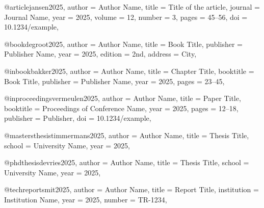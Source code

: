 %
%

@article{jansen2025,
  author  = {Author Name},
  title   = {Title of the article},
  journal = {Journal Name},
  year    = {2025},
  volume  = {12},
  number  = {3},
  pages   = {45--56},
  doi     = {10.1234/example},
}

@book{degroot2025,
  author    = {Author Name},
  title     = {Book Title},
  publisher = {Publisher Name},
  year      = {2025},
  edition   = {2nd},
  address   = {City},
}

@inbook{bakker2025,
  author    = {Author Name},
  title     = {Chapter Title},
  booktitle = {Book Title},
  publisher = {Publisher Name},
  year      = {2025},
  pages     = {23--45},
}

@inproceedings{vermeulen2025,
  author    = {Author Name},
  title     = {Paper Title},
  booktitle = {Proceedings of Conference Name},
  year      = {2025},
  pages     = {12--18},
  publisher = {Publisher},
  doi       = {10.1234/example},
}

@mastersthesis{timmermans2025,
  author = {Author Name},
  title  = {Thesis Title},
  school = {University Name},
  year   = {2025},
}

@phdthesis{devries2025,
  author = {Author Name},
  title  = {Thesis Title},
  school = {University Name},
  year   = {2025},
}

@techreport{smit2025,
  author      = {Author Name},
  title       = {Report Title},
  institution = {Institution Name},
  year        = {2025},
  number      = {TR-1234},
}
